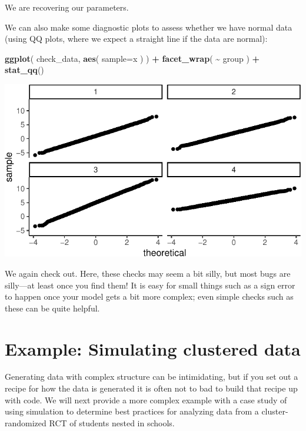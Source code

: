 \documentclass[
]{book}
\newenvironment{Shaded}{\begin{snugshade}}{\end{snugshade}}
\newcommand{\AttributeTok}[1]{\textcolor[rgb]{0.13,0.29,0.53}{#1}}
\newcommand{\FunctionTok}[1]{\textcolor[rgb]{0.13,0.29,0.53}{\textbf{#1}}}
\newcommand{\NormalTok}[1]{#1}
\newcommand{\SpecialCharTok}[1]{\textcolor[rgb]{0.81,0.36,0.00}{\textbf{#1}}}
\begin{document}
We are recovering our parameters.

We can also make some diagnostic plots to assess whether we have normal data (using QQ plots, where we expect a straight line if the data are normal):

\begin{Shaded}
\begin{Highlighting}[]
\FunctionTok{ggplot}\NormalTok{( check\_data, }\FunctionTok{aes}\NormalTok{( }\AttributeTok{sample=}\NormalTok{x ) ) }\SpecialCharTok{+}
  \FunctionTok{facet\_wrap}\NormalTok{( }\SpecialCharTok{\textasciitilde{}}\NormalTok{ group ) }\SpecialCharTok{+}
  \FunctionTok{stat\_qq}\NormalTok{()}
\end{Highlighting}
\end{Shaded}

\begin{center}\includegraphics[width=0.75\linewidth]{Designing-Simulations-in-R_files/figure-latex/unnamed-chunk-72-1} \end{center}

We again check out.
Here, these checks may seem a bit silly, but most bugs are silly---at least once you find them!
It is easy for small things such as a sign error to happen once your model gets a bit more complex; even simple checks such as these can be quite helpful.

\section{Example: Simulating clustered data}\label{case-cluster}

Generating data with complex structure can be intimidating, but if you set out a recipe for how the data is generated it is often not to bad to build that recipe up with code.
We will next provide a more complex example with a case study of using simulation to determine best practices for analyzing data from a cluster-randomized RCT of students nested in schools.
\end{document}
